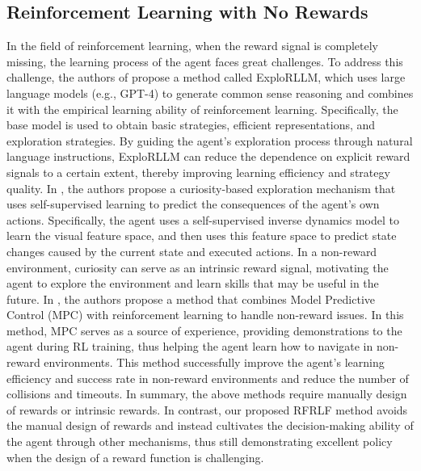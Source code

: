 \subsection{Reinforcement Learning with No Rewards}
In the field of reinforcement learning, when the reward signal is completely missing, the learning process of the agent faces great challenges. To address this challenge, the authors of \cite{ma2024explorllm} propose a method called ExploRLLM, which uses large language models (e.g., GPT-4) to generate common sense reasoning and combines it with the empirical learning ability of reinforcement learning. Specifically, the base model is used to obtain basic strategies, efficient representations, and exploration strategies. By guiding the agent's exploration process through natural language instructions, ExploRLLM can reduce the dependence on explicit reward signals to a certain extent, thereby improving learning efficiency and strategy quality. In \cite{pathak2017curiosity}, the authors propose a curiosity-based exploration mechanism that uses self-supervised learning to predict the consequences of the agent's own actions. Specifically, the agent uses a self-supervised inverse dynamics model to learn the visual feature space, and then uses this feature space to predict state changes caused by the current state and executed actions. In a non-reward environment, curiosity can serve as an intrinsic reward signal, motivating the agent to explore the environment and learn skills that may be useful in the future. In \cite{dawood2023handling}, the authors propose a method that combines Model Predictive Control (MPC) with reinforcement learning to handle non-reward issues. In this method, MPC serves as a source of experience, providing demonstrations to the agent during RL training, thus helping the agent learn how to navigate in non-reward environments. This method successfully improve the agent's learning efficiency and success rate in non-reward environments and reduce the number of collisions and timeouts. In summary, the above methods require manually design of rewards or intrinsic rewards. In contrast, our proposed RFRLF method avoids the manual design of rewards and instead cultivates the decision-making ability of the agent through other mechanisms, thus still demonstrating excellent policy when the design of a reward function is challenging.

